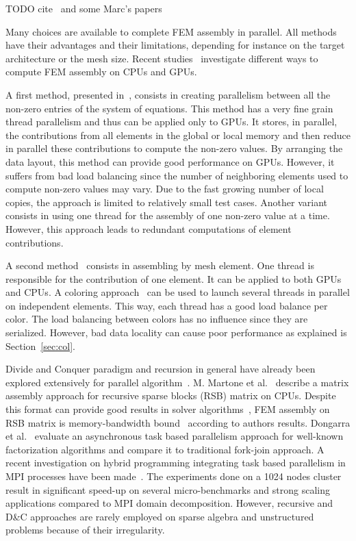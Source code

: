 \documentclass[10pt]{IOS-Book-Article}
\begin{document}
TODO cite~\cite{dc_specfem} and some Marc's papers

Many choices are available to complete FEM assembly in parallel.
All methods have their advantages and their limitations, depending for instance on the target architecture or the mesh size.
Recent studies~\cite{cecka2011assembly,CPUGPUasm} investigate different ways to compute FEM assembly on CPUs and GPUs.

A first method, presented in~\cite{cecka2011assembly}, consists in creating parallelism between all the non-zero entries of the system of equations.
This method has a very fine grain thread parallelism and thus can be applied only to GPUs.
It stores, in parallel, the contributions from all elements in the global or local memory and then reduce in parallel these contributions to compute the non-zero values.
By arranging the data layout, this method can provide good performance on GPUs.
However, it suffers from bad load balancing since the number of neighboring elements used to compute non-zero values may vary.
Due to the fast growing number of local copies, the approach is limited to relatively small test cases.
Another variant consists in using one thread for the assembly of one non-zero value at a time.
However, this approach leads to redundant computations of element contributions.

A second method~\cite{cecka2011assembly} consists in assembling by mesh element.
One thread is responsible for the contribution of one element.
It can be applied to both GPUs and CPUs.
A coloring approach~\cite{CUDAfe,CPUfe} can be used to launch several threads in parallel on independent elements.
This way, each thread has a good load balance per color.
The load balancing between colors has no influence since they are serialized.
However, bad data locality can cause poor performance as explained is Section~\ref{sec:col}.

Divide and Conquer paradigm and recursion in general have already been explored extensively for parallel algorithm~\cite{div}.
M. Martone et al.~\cite{RSBasm} describe a matrix assembly approach for recursive sparse blocks (RSB) matrix on CPUs.
Despite this format can provide good results in solver algorithms~\cite{RSBsolver}, FEM assembly on RSB matrix is memory-bandwidth bound~\cite{RSBasm} according to authors results.
Dongarra et al.~\cite{Dongarra} evaluate an asynchronous task based parallelism approach for well-known factorization algorithms and compare it to traditional fork-join approach.
A recent investigation on hybrid programming integrating task based parallelism in MPI processes have been made~\cite{MPI_task}.
The experiments done on a 1024 nodes cluster result in significant speed-up on several micro-benchmarks and strong scaling applications compared to MPI domain decomposition.
However, recursive and D\&C approaches are rarely employed on sparse algebra and unstructured problems because of their irregularity.
\end{document}
